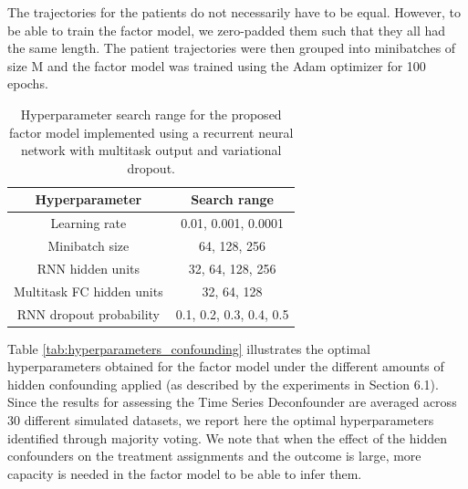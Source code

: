 \documentclass{article}
\begin{document}
    The trajectories for the patients do not necessarily have to be equal. However, to be able to train the factor model, we zero-padded them such that they all had the same length. The patient trajectories were then grouped into minibatches of size M and the factor model was trained using the Adam optimizer \cite{kingma2014adam} for 100 epochs. 
	
	\begin{table}[ht]
		\caption{Hyperparameter search range for the proposed factor model implemented using a recurrent neural network with multitask output and variational dropout.}
		\label{tab:hyperparameters_factor_model}
		\vskip 0.15in
		\begin{center}
			\begin{small}
				\begin{tabular}{cc}
					\toprule
					Hyperparameter & Search range \\
					\hline
					\hline
					Learning rate &    0.01, 0.001, 0.0001    \\
					Minibatch size &  64, 128, 256  \\
					RNN hidden units &  32, 64, 128, 256  \\
					Multitask FC hidden units & 32, 64, 128\\
					RNN dropout probability &  0.1, 0.2, 0.3, 0.4, 0.5 \\
					\bottomrule
				\end{tabular}
			\end{small}
		\end{center}
		\vskip -0.1in
	\end{table}
	
	Table \ref{tab:hyperparameters_confounding} illustrates the optimal hyperparameters obtained for the factor model under the different amounts of hidden confounding applied (as described by the experiments in Section 6.1). Since the results for assessing the Time Series Deconfounder are averaged across  30 different simulated datasets, we report here the optimal hyperparameters identified through majority voting. We note that when the effect of the hidden confounders on the treatment assignments and the outcome is large, more capacity is needed in the factor model to be able to infer them.
	
\end{document}
